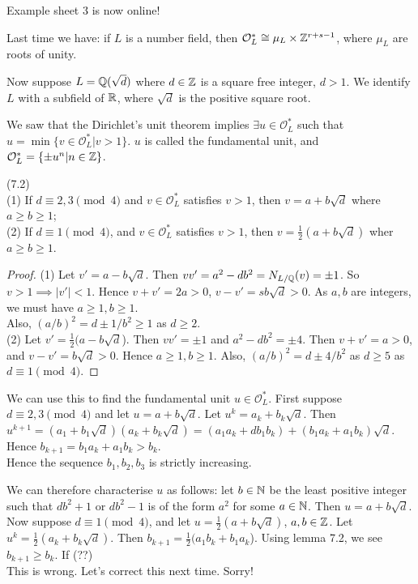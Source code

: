 \documentclass[a4paper]{article}
\begin{document}
Example sheet 3 is now online!

Last time we have: if $L$ is a number field, then $\mathcal{O}_L^* \cong \mu_L \times \mathbb{Z}^{r+s-1}$, where $\mu_L$ are roots of unity.

Now suppose $L = \mathbb{Q}(\sqrt{d})$ where $d \in \mathbb{Z}$ is a square free integer, $d>1$. We identify $L$ with a subfield of $\mathbb{R}$, where $\sqrt{d}$ is the positive square root.

We saw that the Dirichlet's unit theorem implies $\exists u \in \mathcal{O}_L^*$ such that $u = \min \{v \in \mathcal{O}_L^* | v>1\}$. $u$ is called the fundamental unit, and $\mathcal{O}_L^* = \{\pm u^n | n \in \mathbb{Z}\}$.

\begin{lemma} (7.2)\\
(1) If $d \equiv 2,3 \pmod 4$ and $v \in \mathcal{O}_L^*$ satisfies $v > 1$, then $v = a+b\sqrt{d}$ where $a \geq b \geq 1$;\\
(2) If $d \equiv 1 \pmod 4$, and $v \in \mathcal{O}_L^*$ satisfies $v>1$, then $v = \frac{1}{2} (a+b\sqrt{d})$ wher $a \geq b \geq 1$.
\begin{proof}
(1) Let $v' = a-b\sqrt{d}$. Then $vv' = a^2 - db^2 = N_{L/\mathbb{Q}}(v) = \pm 1$. So $v>1 \implies |v'| < 1$. Hence $v+v' = 2a > 0$, $v-v' = sb\sqrt{d} > 0$. As $a,b$ are integers, we must have $a \geq 1, b \geq 1$.\\
Also, $(a/b)^2 = d \pm 1/b^2 \geq 1$ as $d \geq 2$.\\
(2) Let $v' = \frac{1}{2} (a-b\sqrt{d}$). Then $vv' = \pm 1$ and $a^2-db^2 = \pm 4$. Then $v+v' = a > 0$, and $v-v' = b\sqrt{d} > 0$. Hence $a \geq 1, b \geq 1$. Also, $(a/b)^2 = d \pm 4/b^2$ as $d \geq 5$ as $d \equiv 1 \pmod 4$.
\end{proof}
\end{lemma}

We can use this to find the fundamental unit $u \in \mathcal{O}_L^*$. First suppose $d \equiv 2,3 \pmod 4$ and let $u = a+b\sqrt{d}$. Let $u^k = a_k + b_k \sqrt{d}$. Then $u^{k+1} = (a_1 + b_1 \sqrt{d})(a_k + b_k \sqrt{d}) = (a_1a_k + db_1b_k) + (b_1a_k + a_1b_k) \sqrt{d}$. Hence $b_{k+1} = b_1a_k + a_1b_k > b_k$.\\
Hence the sequence $b_1,b_2,b_3$ is strictly increasing.

We can therefore characterise $u$ as follows: let $b \in \mathbb{N}$ be the least positive integer such that $db^2+1$ or $db^2-1$ is of the form $a^2$ for some $a \in \mathbb{N}$. Then $u = a+b\sqrt{d}$.\\
Now suppose $d \equiv 1 \pmod 4$, and let $u = \frac{1}{2} (a+b\sqrt{d})$, $a,b \in \mathbb{Z}$. Let $u^k = \frac{1}{2} (a_k + b_k \sqrt{d})$. Then $b_{k+1} = \frac{1}{2} (a_1b_k + b_1 a_k$). Using lemma 7.2, we see $b_{k+1} \geq b_k$. If (??)\\
This is wrong. Let's correct this next time. Sorry!
\end{document}
